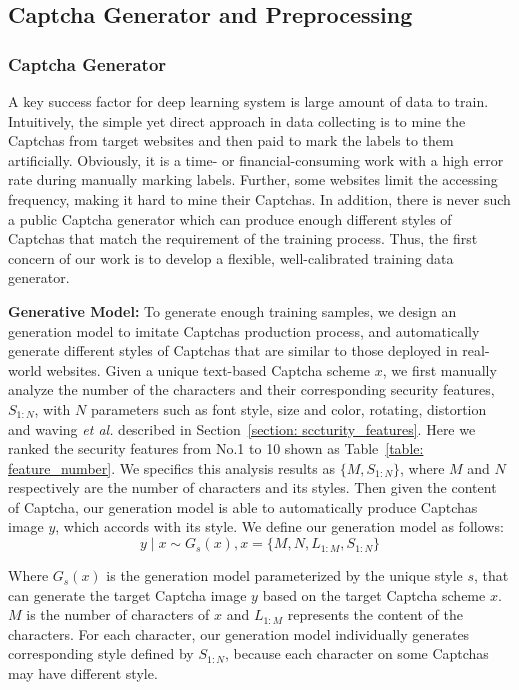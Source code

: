 \subsection{Captcha Generator and Preprocessing} \label{section: Captcha_generator}
\subsubsection{Captcha Generator}
A key success factor for deep learning system is large amount of data to train.
Intuitively, the simple yet direct approach in data collecting is to mine the Captchas from target websites and then paid to mark the labels to them artificially. Obviously, it is a time- or financial-consuming work with a high error rate during manually marking labels.
Further, some websites limit the accessing frequency, making it hard to mine their Captchas.
In addition, there is never such a public Captcha generator which can produce enough different styles of Captchas that match the requirement of the training process.
Thus, the first concern of our work is to develop a flexible, well-calibrated training data generator.

\noindent \textbf{Generative Model:} To generate enough training samples, we design an generation model to imitate Captchas production process, and automatically generate different styles of Captchas that are similar to those deployed in real-world websites.
Given a unique text-based Captcha scheme $x$, we first manually analyze the number of the characters and their corresponding security features, $S_{1:N}$, with $N$ parameters such as font style, size and color, rotating, distortion and waving \emph{et al.} described in Section~\ref{section: sccturity_features}.
Here we ranked the security features from No.1 to 10 shown as Table~\ref{table: feature_number}.
We specifics this analysis results as $\{ M, S_{1:N} \}$, where $M$ and $N$ respectively are the number of characters and its styles.
Then given the content of Captcha, our generation model is able to automatically produce Captchas image $y$, which accords with its style.
We define our generation model as follows:
\begin{equation}\label{equation: generator_model}
  y \mid x \sim G_s(x),    x = \{M, N, L_{1:M}, S_{1:N} \}
\end{equation}

Where $G_s(x)$ is the generation model parameterized by the unique style $s$, that can generate the target Captcha image $y$ based on the target Captcha scheme $x$. $M$ is the number of characters of $x$ and $L_{1:M}$ represents the content of the characters. For each character, our generation model individually generates corresponding style defined by $S_{1:N}$, because each character on some Captchas may have different style.

